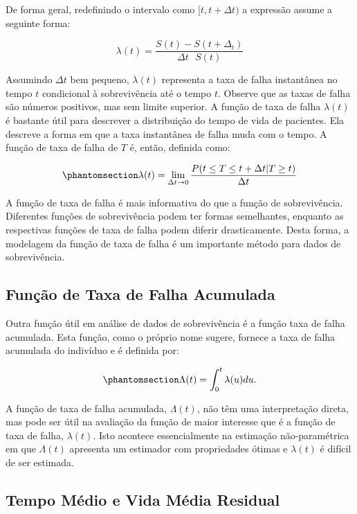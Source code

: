 \documentclass[
  12pt,
  letterpaper,
  DIV=11,
  numbers=noendperiod]{scrreprt}
\begin{document}
De forma geral, redefinindo o intervalo como \([t, t + \Delta t)\) a
expressão assume a seguinte forma:

\[
\lambda(t) = \dfrac{S(t) - S(t + \Delta_{t})}{\Delta t \text{ } S(t)}
\]

Assumindo \(\Delta t\) bem pequeno, \(\lambda(t)\) representa a taxa de
falha instantânea no tempo \(t\) condicional à sobrevivência até o tempo
\(t\). Observe que as taxas de falha são números positivos, mas sem
limite superior. A função de taxa de falha \(\lambda(t)\) é bastante
útil para descrever a distribuição do tempo de vida de pacientes. Ela
descreve a forma em que a taxa instantânea de falha muda com o tempo. A
função de taxa de falha de \(T\) é, então, definida como:

\begin{equation}\phantomsection\label{eq-fTaxaFalha}{
\lambda(t) = \lim_{\Delta t \to 0} \dfrac{P(t \leq T \leq t + \Delta t | T \geq t)}{\Delta t}
}\end{equation}

A função de taxa de falha é mais informativa do que a função de
sobrevivência. Diferentes funções de sobrevivência podem ter formas
semelhantes, enquanto as respectivas funções de taxa de falha podem
diferir drasticamente. Desta forma, a modelagem da função de taxa de
falha é um importante método para dados de sobrevivência.

\subsection{Função de Taxa de Falha Acumulada}\label{sec-TaxaAcu}

Outra função útil em análise de dados de sobrevivência é a função taxa
de falha acumulada. Esta função, como o próprio nome sugere, fornece a
taxa de falha acumulada do indivíduo e é definida por:

\begin{equation}\phantomsection\label{eq-fTaxaFalhaAcumul}{
\Lambda(t) = \int_{0}^{t} \lambda(u) du.
}\end{equation}

A função de taxa de falha acumulada, \(\Lambda(t)\), não têm uma
interpretação direta, mas pode ser útil na avaliação da função de maior
interesse que é a função de taxa de falha, \(\lambda(t)\). Isto acontece
essencialmente na estimação não-paramétrica em que \(\Lambda(t)\)
apresenta um estimador com propriedades ótimas e \(\lambda(t)\) é
difícil de ser estimada.

\subsection{Tempo Médio e Vida Média
Residual}\label{tempo-muxe9dio-e-vida-muxe9dia-residual}
\end{document}
